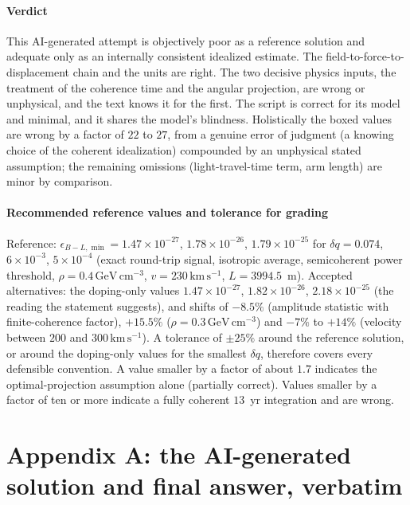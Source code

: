 \paragraph*{Verdict}
This AI-generated attempt is objectively poor as a reference solution and adequate only as an internally consistent idealized estimate. The field-to-force-to-displacement chain and the units are right. The two decisive physics inputs, the treatment of the coherence time and the angular projection, are wrong or unphysical, and the text knows it for the first. The script is correct for its model and minimal, and it shares the model's blindness. Holistically the boxed values are wrong by a factor of $22$ to $27$, from a genuine error of judgment (a knowing choice of the coherent idealization) compounded by an unphysical stated assumption; the remaining omissions (light-travel-time term, arm length) are minor by comparison.

\paragraph*{Recommended reference values and tolerance for grading}
Reference: $\epsilon_{B-L,\min}=1.47\times10^{-27}$, $1.78\times10^{-26}$, $1.79\times10^{-25}$ for $\delta q=0.074$, $6\times10^{-3}$, $5\times10^{-4}$ (exact round-trip signal, isotropic average, semicoherent power threshold, $\rho=0.4\,\mathrm{GeV\,cm^{-3}}$, $v=230\,\mathrm{km\,s^{-1}}$, $L=3994.5$~m). Accepted alternatives: the doping-only values $1.47\times10^{-27}$, $1.82\times10^{-26}$, $2.18\times10^{-25}$ (the reading the statement suggests), and shifts of $-8.5\%$ (amplitude statistic with finite-coherence factor), $+15.5\%$ ($\rho=0.3\,\mathrm{GeV\,cm^{-3}}$) and $-7\%$ to $+14\%$ (velocity between $200$ and $300\,\mathrm{km\,s^{-1}}$). A tolerance of $\pm25\%$ around the reference solution, or around the doping-only values for the smallest $\delta q$, therefore covers every defensible convention. A value smaller by a factor of about $1.7$ indicates the optimal-projection assumption alone (partially correct). Values smaller by a factor of ten or more indicate a fully coherent $13$~yr integration and are wrong.

\clearpage
\section*{Appendix A: the AI-generated solution and final answer, verbatim}
\begingroup
\small


\endgroup


